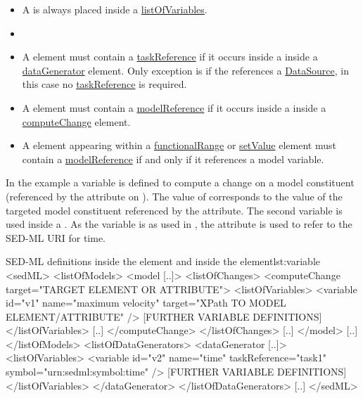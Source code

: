 \begin{itemize}
	\item A \Variable is always placed inside a \hyperref[sec:listOfVariables]{listOfVariables}.  
	\item {}
	\item A \Variable element must contain a \hyperref[sec:taskReference]{taskReference} if it occurs inside a \hyperref[sec:listOfVariables]{} inside a \hyperref[class:dataGenerator]{dataGenerator} element. Only exception is if the \Variable references a \hyperref[class:dataSource]{DataSource}, in this case no \hyperref[sec:taskReference]{taskReference} is required.
	\item A \Variable element must contain a \hyperref[sec:modelReference]{modelReference} if it occurs inside a \hyperref[sec:listOfVariables]{} inside a \hyperref[class:computeChange]{computeChange} element.
	\item A \Variable  element appearing within a \hyperref[class:functionalRange]{functionalRange} or \hyperref[class:setValue]{setValue} element must contain a \hyperref[sec:modelReference]{modelReference} if and only if it references a model variable.
\end{itemize}

In the example a variable  is defined to compute a change on a model constituent (referenced by the \hyperref[sec:target]{} attribute on \hyperref[class:computeChange]{}). The value of  corresponds to the value of the targeted model constituent referenced by the  attribute. The second variable  is used inside a \hyperref[class:dataGenerator]{}. As the variable is  as used in , the \hyperref[sec:symbol]{} attribute is used to refer to the SED-ML URI for time.

\begin{myXmlLst}{SED-ML  definitions inside the  element and inside the  element}{lst:variable}
<sedML>
	<listOfModels>
		<model [..]>
			<listOfChanges>
				<computeChange target="TARGET ELEMENT OR ATTRIBUTE">
				<listOfVariables>
				   <variable id="v1" name="maximum velocity" target="XPath TO MODEL ELEMENT/ATTRIBUTE" />
				   [FURTHER VARIABLE DEFINITIONS]
				</listOfVariables>
				[..]
				</computeChange>
			</listOfChanges>
			[..]
		</model>
		[..]
	</listOfModels>
	<listOfDataGenerators>
		<dataGenerator [..]>
			<listOfVariables>
				<variable id="v2" name="time" taskReference="task1" symbol="urn:sedml:symbol:time" />
				[FURTHER VARIABLE DEFINITIONS]
			</listOfVariables>
		</dataGenerator>
	</listOfDataGenerators>
	[..]
</sedML>
\end{myXmlLst}


